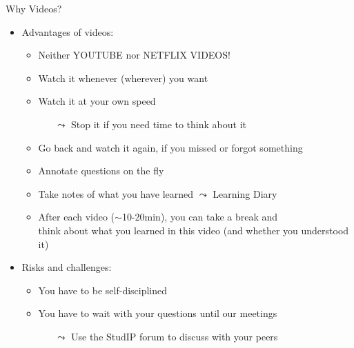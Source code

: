 \documentclass[aspectratio=169]{../latex_main/tntbeamer}  %
\begin{document}
\begin{frame}[c]{Why Videos?}

\begin{itemize}
  \item Advantages of videos:
  \begin{itemize}
      \item Neither YOUTUBE nor NETFLIX VIDEOS!
      \item Watch it whenever (wherever) you want
      \item Watch it at your own speed
      \begin{itemize}
          \item[$\leadsto$] Stop it if you need time to think about it
      \end{itemize}
      \item Go back and watch it again, if you missed or forgot something
      \item Annotate questions on the fly %
      \item Take notes of what you have learned $\leadsto$ Learning Diary
      \item After each video ($\sim$10-20min), you can take a break and\\ think about what you learned in this video (and whether you understood it)
  \end{itemize}
  \medskip
  \pause
  \item Risks and challenges:
  \begin{itemize}
      \item You have to be self-disciplined 
      \item You have to wait with your questions until our meetings
      \begin{itemize}
          \item[$\leadsto$] Use the StudIP forum to discuss with your peers
      \end{itemize}
  \end{itemize}
\end{itemize}

\end{frame}
\end{document}
